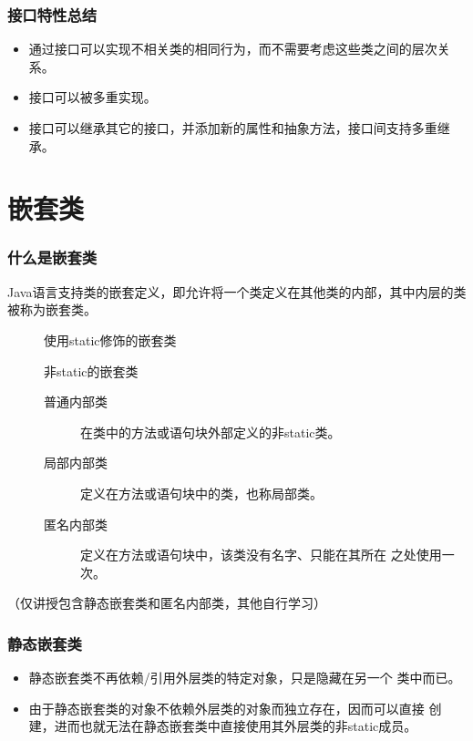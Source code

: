 \begin{frame}[fragile] %
  \frametitle{接口特性总结}

  \begin{itemize}[<+-| alert@+>]
  \item 通过接口可以实现不相关类的相同行为，而不需要考虑这些类之间的层次关系。
  \item 接口可以被多重实现。
  \item 接口可以继承其它的接口，并添加新的属性和抽象方法，接口间支持多重继承。
  \end{itemize}
\end{frame}

\section{嵌套类}
\begin{frame}[fragile] %
  \frametitle{什么是嵌套类}

  Java语言支持类的嵌套定义，即允许将一个类定义在其他类的内部，其中内层的类被称为嵌套类。

  
  \begin{description}
  \item[] 使用static修饰的嵌套类
  \item[] 非static的嵌套类
    \begin{description}
    \item[普通内部类] 在类中的方法或语句块外部定义的非static类。
    \item[局部内部类] 定义在方法或语句块中的类，也称局部类。
    \item[匿名内部类] 定义在方法或语句块中，该类没有名字、只能在其所在
      之处使用一次。
    \end{description}
  \end{description}

  {\kai （仅讲授包含静态嵌套类和匿名内部类，其他自行学习）}
  
\end{frame}


\begin{frame}[fragile] %
  \frametitle{静态嵌套类}

  
  \begin{itemize}
  \item {\hei 静态嵌套类不再依赖/引用外层类的特定对象，只是隐藏在另一个
      类中而已。}
  \item 由于静态嵌套类的对象不依赖外层类的对象而独立存在，因而可以直接
    创建，进而也就无法在静态嵌套类中直接使用其外层类的非static成员。
  \end{itemize}

\end{frame}

